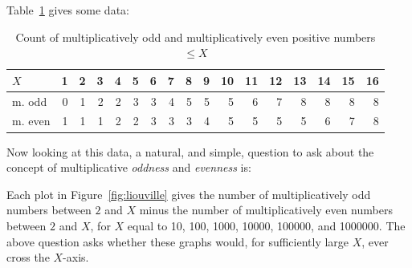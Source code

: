 \documentclass[openany]{book}
\theoremstyle{plain}
\theoremstyle{definition}
\begin{document}
  
 Table~\ref{tab:evenodddata} gives some data:
   
 \begin{table}[H] \caption{Count of multiplicatively odd and
    multiplicatively even positive numbers $\le X$\label{tab:evenodddata}}
\vspace{1ex}
\centering
 {\small
\begin{tabular}{|l|r|r|r|r|r|r|r|r|r|r|r|r|r|r|r|r|}
\hline
$X$ & 1 & 2 & 3 & 4 & 5  & 6 & 7 & 8 & 9 & 10 & 11 & 12 & 13 & 14 & 15 & 16  \\ \hline\hline
m. odd & 0 & 1 & 2 & 2 & 3  & 3 & 4 & 5 & 5 & 5 & 6 & 7 & 8 & 8 & 8 & 8 \\ \hline
m. even & 1 & 1 & 1 & 2 & 2  & 3 & 3 & 3 & 4 & 5 & 5 & 5 & 5 & 6 & 7 & 8 \\ \hline
\end{tabular}} 
\end{table}

  
   Now looking at this data, a natural, and simple, question to ask about the concept of multiplicative {\em oddness} and {\em evenness} is: 
   

   Each plot in Figure~\ref{fig:liouville} gives the number of
   multiplicatively odd numbers between $2$ and $X$ minus the number
   of multiplicatively even numbers between $2$ and $X$, for $X$ equal
   to 10, 100, 1000, 10000, 100000, and 1000000. The above question
   asks whether these graphs would, for sufficiently large $X$, ever
   cross the $X$-axis.
\end{document}
